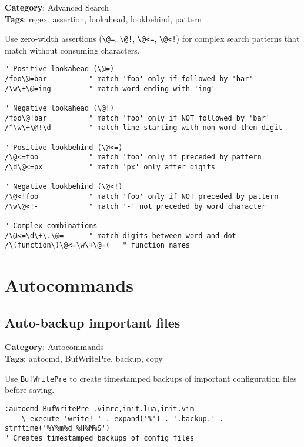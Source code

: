{\textbf{Category}: Advanced Search\\ \textbf{Tags}: regex, assertion, lookahead, lookbehind, pattern
\vspace{0.5cm}

Use zero-width assertions ({\footnotesize \Verb§\@=§}, {\footnotesize \Verb§\@!§}, {\footnotesize \Verb§\@<=§}, {\footnotesize \Verb§\@<!§}) for complex search patterns that match without consuming characters.

\begin{Exa*}{}
\begin{Verbatim}[fontsize=\footnotesize, breaklines, breakanywhere]
" Positive lookahead (\@=)
/foo\@=bar          " match 'foo' only if followed by 'bar'
/\w\+\@=ing         " match word ending with 'ing'

" Negative lookahead (\@!)
/foo\@!bar          " match 'foo' only if NOT followed by 'bar'
/^\w\+\@!\d         " match line starting with non-word then digit

" Positive lookbehind (\@<=)
/\@<=foo            " match 'foo' only if preceded by pattern
/\d\@<=px           " match 'px' only after digits

" Negative lookbehind (\@<!)
/\@<!foo            " match 'foo' only if NOT preceded by pattern
/\w\@<!-            " match '-' not preceded by word character

" Complex combinations
/\@<=\d\+\.\@=      " match digits between word and dot
/\(function\)\@<=\w\+\@=(   " function names
\end{Verbatim}
\end{Exa*}

\chapter{Autocommands}
\section{Auto-backup important files}

\textbf{Category}: Autocommands\\ \textbf{Tags}: autocmd, BufWritePre, backup, copy
\vspace{0.5cm}

Use {\footnotesize \Verb§BufWritePre§} to create timestamped backups of important configuration files before saving.

\begin{Exa*}{}
\begin{Verbatim}[fontsize=\footnotesize, breaklines, breakanywhere]
:autocmd BufWritePre .vimrc,init.lua,init.vim 
    \ execute 'write! ' . expand('%') . '.backup.' . strftime('%Y%m%d_%H%M%S')
" Creates timestamped backups of config files
\end{Verbatim}
\end{Exa*}

}

